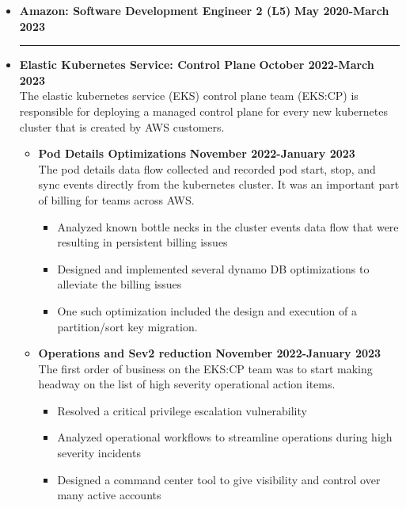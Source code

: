 \documentclass[overlapped]{res}
\begin{document}
\begin{resume}
\begin{itemize}[leftmargin=0in]
    \item[]
    \textbf{Amazon: Software Development Engineer 2 (L5)} \hfill \textbf{May 2020-March 2023} \\[-0.1in] \rule{\textwidth}{0.5pt}
    \vspace{0.125in}
    \item[]
    \textbf{Elastic Kubernetes Service: Control Plane} \hfill \textbf{October 2022-March 2023} \\
    The elastic kubernetes service (EKS) control plane team (EKS:CP) is responsible for deploying a managed control plane for every new kubernetes cluster that is created by AWS customers.
    \begin{itemize}
        \item[]
        \textbf{Pod Details Optimizations} \hfill \textbf{November 2022-January 2023} \\
        The pod details data flow collected and recorded pod start, stop, and sync events directly from the kubernetes cluster. It was an important part of billing for teams across AWS.
        \begin{itemize}
            \item[\textbullet] Analyzed known bottle necks in the cluster events data flow that were resulting in persistent billing issues
            \item[\textbullet] Designed and implemented several dynamo DB optimizations to alleviate the billing issues
            \item[\textbullet] One such optimization included the design and execution of a partition/sort key migration.
        \end{itemize}
        \vspace{0.125in}
        \item[]
        \textbf{Operations and Sev2 reduction} \hfill \textbf{November 2022-January 2023} \\
        The first order of business on the EKS:CP team was to start making headway on the list of high severity operational action items.
        \begin{itemize}
            \item[\textbullet] Resolved a critical privilege escalation vulnerability 
            \item[\textbullet] Analyzed operational workflows to streamline operations during high severity incidents
            \item[\textbullet] Designed a command center tool to give visibility and control over many active accounts

\end{itemize}
\end{itemize}
\end{itemize}
\end{resume}
\end{document}
